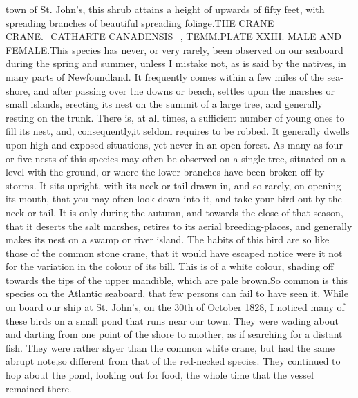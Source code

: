 \documentclass[a4paper]{article}
\begin{document}
town of St. John's, this shrub attains a height of upwards of fifty feet, with spreading branches of beautiful spreading foliage.THE CRANE CRANE._CATHARTE CANADENSIS_, TEMM.PLATE XXIII. MALE AND FEMALE.This species has never, or very rarely, been observed on our seaboard during the spring and summer, unless I mistake not, as is said by the natives, in many parts of Newfoundland. It frequently comes within a few miles of the sea-shore, and after passing over the downs or beach, settles upon the marshes or small islands, erecting its nest on the summit of a large tree, and generally resting on the trunk. There is, at all times, a sufficient number of young ones to fill its nest, and, consequently,it seldom requires to be robbed. It generally dwells upon high and exposed situations, yet never in an open forest. As many as four or five nests of this species may often be observed on a single tree, situated on a level with the ground, or where the lower branches have been broken off by storms. It sits upright, with its neck or tail drawn in, and so rarely, on opening its mouth, that you may often look down into it, and take your bird out by the neck or tail. It is only during the autumn, and towards the close of that season, that it deserts the salt marshes, retires to its aerial breeding-places, and generally makes its nest on a swamp or river island. The habits of this bird are so like those of the common stone crane, that it would have escaped notice were it not for the variation in the colour of its bill. This is of a white colour, shading off towards the tips of the upper mandible, which are pale brown.So common is this species on the Atlantic seaboard, that few persons can fail to have seen it. While on board our ship at St. John's, on the 30th of October 1828, I noticed many of these birds on a small pond that runs near our town. They were wading about and darting from one point of the shore to another, as if searching for a distant fish. They were rather shyer than the common white crane, but had the same abrupt note,so different from that of the red-necked species. They continued to hop about the pond, looking out for food, the whole time that the vessel remained there.
\end{document}
